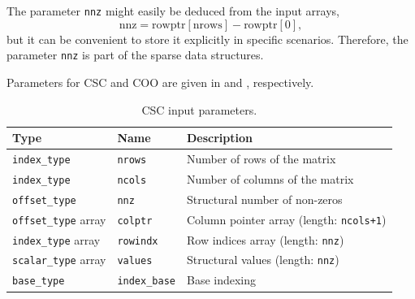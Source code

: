 \documentclass[manuscript,review]{acmart}
\begin{document}
The parameter \texttt{nnz} might easily be deduced from the input arrays,
\[\textrm{nnz} = \textrm{rowptr}[\textrm{nrows}] - \textrm{rowptr}[0],\] 
but it can be convenient to store it explicitly in specific scenarios. Therefore, the parameter \texttt{nnz} is part of the sparse data structures.

Parameters for CSC and COO are given in  and , respectively.






\begin{table}[htbp]
  \centering
  \caption{CSC input parameters.}
  \label{tab:csc_param}
  \begin{tabularx}{\linewidth}{l l X}
    \toprule
    \textbf{Type} & \textbf{Name} & \textbf{Description} \\
    \midrule
    \texttt{index\_type}        & \texttt{nrows}      & Number of rows of the matrix \\
    \texttt{index\_type}        & \texttt{ncols}      & Number of columns of the matrix \\
    \texttt{offset\_type}       & \texttt{nnz}        & Structural number of non-zeros \\
    \texttt{offset\_type} array & \texttt{colptr}     & Column pointer array (length: \texttt{ncols+1}) \\
    \texttt{index\_type} array  & \texttt{rowindx}    & Row indices array (length: \texttt{nnz}) \\
    \texttt{scalar\_type} array & \texttt{values}     & Structural values (length: \texttt{nnz}) \\
    \texttt{base\_type}         & \texttt{index\_base}& Base indexing \\
    \bottomrule
  \end{tabularx}
\end{table}
\end{document}
